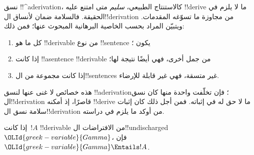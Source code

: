 \documentclass[../../../include/open-logic-section]{subfiles}
\begin{document}
      {}
      {}
      

\begin{explain}
نسق !!^a{derivation}، كالاستنتاج الطبيعي، \emph{سليم} متى امتنع عليه
!!{derive} ما لا يلزم في الحقيقة. فالسلامة ضمان لأنساق ال!!{derivation}
من مجاوزة ما تسوّغه المقدمات. ويتبيّن المراد بحسب الخاصية البرهانية
المبحوث عنها؛ فمن ذلك:
\begin{enumerate}
\item كل ما هو !!{derivable} من نوع !!{sentence} يكون ؛
\item إذا كانت !!a{sentence} !!{derivable} من جمل أخرى، فهي أيضًا
  نتيجة لها؛
\item إذا كانت مجموعة من ال!!{sentence}s غير متسقة، فهي غير قابلة
  للإرضاء.
\end{enumerate}
هذه خصائص لا غنى عنها لنسق !!a{derivation}؛ فإن تخلّفت واحدة منها
كان نسق ال!!{derivation} قاصرًا، إذ أمكنه !!{derive} ما لا حق له في
إثباته. فمن أجل ذلك كان إثبات سلامة نسق ال!!{derivation} من أوكد
ما يلزم في دراسته.
\end{explain}

\begin{thm}[السلامة]
إذا كانت~$!A$ !!{derivable} من الافتراضات ال!!{undischarged}
${\OLId{greek-variable}{Gamma}}$، فإن~${\OLId{greek-variable}{Gamma}} \Entails !A$.
\end{thm}
\end{document}
